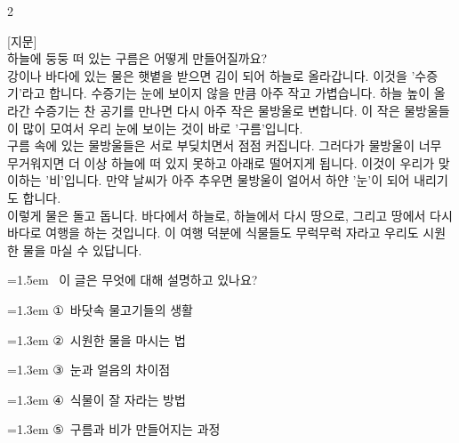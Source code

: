 \documentclass[12pt, a4paper]{article}
\begin{document}
\begin{multicols}{2}
\vspace{1mm}
\vspace{0.5mm}

\begin{passagebox}
\noindent{}[지문] \\
하늘에 둥둥 떠 있는 구름은 어떻게 만들어질까요? \\
강이나 바다에 있는 물은 햇볕을 받으면 김이 되어 하늘로 올라갑니다. 이것을 '수증기'라고 합니다. 수증기는 눈에 보이지 않을 만큼 아주 작고 가볍습니다. 하늘 높이 올라간 수증기는 찬 공기를 만나면 다시 아주 작은 물방울로 변합니다. 이 작은 물방울들이 많이 모여서 우리 눈에 보이는 것이 바로 '구름'입니다.
\\[0.5em]
구름 속에 있는 물방울들은 서로 부딪치면서 점점 커집니다. 그러다가 물방울이 너무 무거워지면 더 이상 하늘에 떠 있지 못하고 아래로 떨어지게 됩니다. 이것이 우리가 맞이하는 '비'입니다. 만약 날씨가 아주 추우면 물방울이 얼어서 하얀 '눈'이 되어 내리기도 합니다.
\\[0.5em]
이렇게 물은 돌고 돕니다. 바다에서 하늘로, 하늘에서 다시 땅으로, 그리고 땅에서 다시 바다로 여행을 하는 것입니다. 이 여행 덕분에 식물들도 무럭무럭 자라고 우리도 시원한 물을 마실 수 있답니다.
\end{passagebox}
\vspace{1mm}

\noindent\begin{minipage}{\columnwidth}
\vspace{2mm}
{\hangindent=1.5em  ~이 글은 무엇에 대해 설명하고 있나요?\par}

\vspace{0.5mm}
{\hangindent=1.3em  \noindent\hspace{0.3em}①~바닷속 물고기들의 생활\par}
{\hangindent=1.3em  \noindent\hspace{0.3em}②~시원한 물을 마시는 법\par}
{\hangindent=1.3em  \noindent\hspace{0.3em}③~눈과 얼음의 차이점\par}
{\hangindent=1.3em  \noindent\hspace{0.3em}④~식물이 잘 자라는 방법\par}
{\hangindent=1.3em  \noindent\hspace{0.3em}⑤~구름과 비가 만들어지는 과정\par}
\vspace{4mm}
\end{minipage}
\par


\end{multicols}
\end{document}
